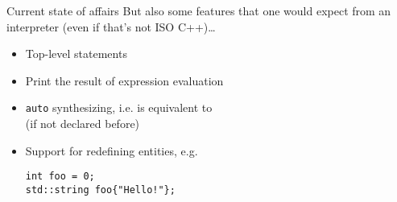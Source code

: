 \begin{frame}[fragile]{Current state of affairs}
  But also some features that one would expect from an interpreter (even if that's not ISO C++)\ldots{}
  \vfill
  \begin{itemize}
    \itemsep=1ex

  \item Top-level statements

  \item Print the result of expression evaluation

  \item \texttt{auto} synthesizing, i.e.  is equivalent to \\
    (if  not declared before) \deprecated{}

  \item Support for redefining entities, e.g.
\begin{lstlisting}[style=C++]
int foo = 0;
std::string foo{"Hello!"};
\end{lstlisting}
  \end{itemize}
\end{frame}
